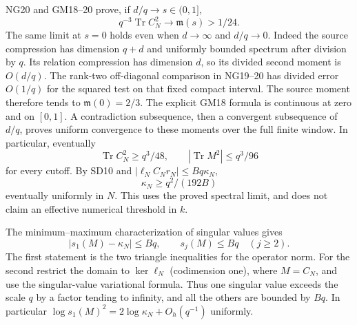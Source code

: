 \documentclass[11pt]{article}
\newcommand{\Tr}{\operatorname{Tr}}\newcommand{\rank}{\operatorname{rank}}
\begin{document}
NG20 and GM18--20 prove, if $d/q\to s\in(0,1]$,
\[
q^{-3}\Tr C_N^2\longrightarrow\mathfrak m(s)>1/24.
\]
The same limit at $s=0$ holds even when $d\to\infty$ and $d/q\to0$.
Indeed the source compression has dimension $q+d$ and uniformly
bounded spectrum after division by $q$. Its relation compression has
dimension $d$, so its divided second moment is $O(d/q)$. The rank-two
off-diagonal comparison in NG19--20 has divided error $O(1/q)$ for
the squared test on that fixed compact interval. The source moment
therefore tends to $\mathfrak m(0)=2/3$. The explicit GM18 formula
is continuous at zero and on $[0,1]$. A contradiction subsequence,
then a convergent subsequence of $d/q$, proves uniform convergence to
these moments over the full finite window. In particular, eventually
\[
\Tr C_N^2\ge q^3/48,\qquad |\Tr M^2|\le q^3/96
\]
for every cutoff. By SD10 and $|\ell_N C_Nr_N|\le Bq\kappa_N$,
\begin{equation}\tag{SD11}
\boxed{\kappa_N\ge q^2/(192B)}
\end{equation}
eventually uniformly in $N$. This uses the proved spectral limit, and
does not claim an effective numerical threshold in $k$.

The minimum--maximum characterization of singular values gives
\begin{equation}\tag{SD12}
|s_1(M)-\kappa_N|\le Bq,\qquad s_j(M)\le Bq\quad(j\ge2).
\end{equation}
The first statement is the two triangle inequalities for the operator
norm. For the second restrict the domain to $\ker\ell_N$ (codimension
one), where $M=C_N$, and use the singular-value variational formula.
Thus one singular value exceeds the scale $q$ by a factor tending to
infinity, and all the others are bounded by $Bq$. In particular
$\log s_1(M)^2=2\log\kappa_N+O_h(q^{-1})$ uniformly.
\end{document}

